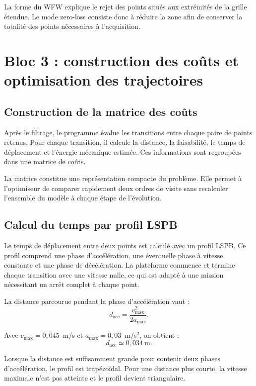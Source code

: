 La forme du WFW explique le rejet des points situés aux extrémités de la grille étendue. Le mode \og zero-loss \fg{} consiste donc à réduire la zone afin de conserver la totalité des points nécessaires à l'acquisition.

\section{Bloc 3 : construction des coûts et optimisation des trajectoires}
\label{sec:bloc_optimisation}

\subsection{Construction de la matrice des coûts}

Après le filtrage, le programme évalue les transitions entre chaque paire de points retenus. Pour chaque transition, il calcule la distance, la faisabilité, le temps de déplacement et l'énergie mécanique estimée. Ces informations sont regroupées dans une matrice de coûts.

La matrice constitue une représentation compacte du problème. Elle permet à l'optimiseur de comparer rapidement deux ordres de visite sans recalculer l'ensemble du modèle à chaque étape de l'évolution.

\subsection{Calcul du temps par profil LSPB}

Le temps de déplacement entre deux points est calculé avec un profil LSPB. Ce profil comprend une phase d'accélération, une éventuelle phase à vitesse constante et une phase de décélération. La plateforme commence et termine chaque transition avec une vitesse nulle, ce qui est adapté à une mission nécessitant un arrêt complet à chaque point.

La distance parcourue pendant la phase d'accélération vaut :
\begin{equation}
d_{\mathrm{acc}}=\frac{v_{\max}^2}{2a_{\max}}.
\label{eq:dacc_tandem}
\end{equation}

Avec $v_{\max}=0{,}045$~m/s et $a_{\max}=0{,}03$~m/s$^2$, on obtient :
\begin{equation}
d_{\mathrm{acc}}\simeq0{,}034~\text{m}.
\end{equation}

Lorsque la distance est suffisamment grande pour contenir deux phases d'accélération, le profil est trapézoïdal. Pour une distance plus courte, la vitesse maximale n'est pas atteinte et le profil devient triangulaire.


